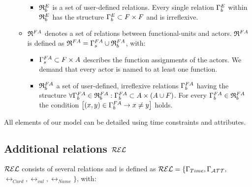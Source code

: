 \begin{itemize}
\begin{itemize}
\begin{itemize}
			\item $\relmengebenutzerinstOE_F$ is a set of user-defined relations. Every single relation ${\relbenutzerinstOE_F}$ within $\relmengebenutzerinstOE_F$ has the structure ${\relbenutzerinstOE_F} \subset \f \times \f$ and is irreflexive.
			\end{itemize}

		\item ${\mathfrak{R}}^{FA}$ denotes a set of relations between functional-units and actors. ${\mathfrak{R}}^{FA}$ is defined as ${\mathfrak{R}}^{FA} = {\Gamma}^{FA}_{s} \cup {\mathfrak{R}}^{FA}_{b}$, with:

			\begin{itemize}

			\item ${\Gamma}^{FA}_{s} \subset F \times A$ describes the function assignments of the actors. We demand that every actor is named to at least one function.

			\item ${\mathfrak{R}}^{FA}_{b}$ a set of user-defined, irreflexive relations 	${{\Gamma}^{FA}_{b}}$ having the structure $\forall {{\Gamma}^{FA}_{b}} \in {\mathfrak{R}}^{FA}_{b}: {{\Gamma}^{FA}_{b}} \subset A \times (A \cup F)$. For every ${\Gamma}^{FA}_{b} \in {\mathfrak{R}}^{FA}_{b}$ the condition		$\left[(x,y) \in {\Gamma}^{FA}_{b} \rightarrow x \neq y \right]$ holds.
			\end{itemize}

		\end{itemize}

	\end{itemize}

	All elements of our model can be detailed using time constraints and attributes.

\subsection{Additional relations $\mathcal{REL}$}

	$\mathcal{REL}$ consists of several relations and is defined as $\mathcal{REL} =\{ \Gamma_{Time}, \Gamma_{\mathcal{ATT}},$ $\rel_{Card}, \rel_{val}, \rel_{Name}\}$, with:

